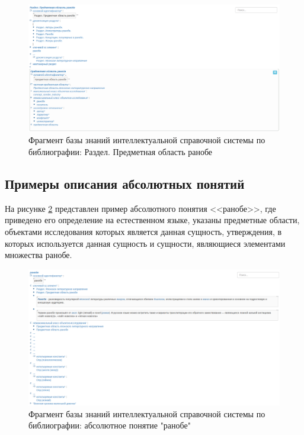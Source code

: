 \begin{figure}[H]
    \centering
    \includegraphics[scale=0.4]{imgs/subj_ranobe.png}
    \caption{Фрагмент базы знаний интеллектуальной справочной системы по библиографии: Раздел. Предметная область ранобе}
    \label{fig:subj_ranobe}
\end{figure}

\subsection{Примеры описания абсолютных понятий}


На рисунке \ref{fig:absolute_ranobe} представлен пример абсолютного понятия <<ранобе>>, где приведено его определение на естественном языке, указаны предметные области, объектами исследования которых является данная сущность, утверждения, в которых используется данная сущность и сущности, являющиеся элементами множества ранобе.

\begin{figure}[H]
    \centering
    \includegraphics[scale=0.415]{imgs/ranobe.png}
    \caption{Фрагмент базы знаний интеллектуальной справочной системы по библиографии: абсолютное понятие "ранобе"}
    \label{fig:absolute_ranobe}
\end{figure}

